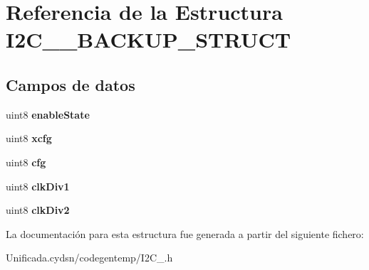 \hypertarget{struct_i2_c__1___b_a_c_k_u_p___s_t_r_u_c_t}{}\section{Referencia de la Estructura I2\+C\+\_\+\_\+\+B\+A\+C\+K\+U\+P\+\_\+\+S\+T\+R\+U\+CT}
\label{struct_i2_c__1___b_a_c_k_u_p___s_t_r_u_c_t}
\subsection*{Campos de datos}
\begin{DoxyCompactItemize}
\item 
\mbox{\label{struct_i2_c__1___b_a_c_k_u_p___s_t_r_u_c_t_a0d9eac82e0d9647810c46a0da6e36302}} 
uint8 {\bfseries enable\+State}
\item 
\mbox{\label{struct_i2_c__1___b_a_c_k_u_p___s_t_r_u_c_t_a715f36badc706ac162df2688e42d0111}} 
uint8 {\bfseries xcfg}
\item 
\mbox{\label{struct_i2_c__1___b_a_c_k_u_p___s_t_r_u_c_t_ab8eb8d5560ec63aaa6b0521bfb9c34d9}} 
uint8 {\bfseries cfg}
\item 
\mbox{\label{struct_i2_c__1___b_a_c_k_u_p___s_t_r_u_c_t_a82ea4753093a33ff6f406c8cd6a9e173}} 
uint8 {\bfseries clk\+Div1}
\item 
\mbox{\label{struct_i2_c__1___b_a_c_k_u_p___s_t_r_u_c_t_afc3c99a74dcecfae2a734bf008319b56}} 
uint8 {\bfseries clk\+Div2}
\end{DoxyCompactItemize}


La documentación para esta estructura fue generada a partir del siguiente fichero\+:\begin{DoxyCompactItemize}
\item 
Unificada.\+cydsn/codegentemp/I2\+C\+\_.\+h\end{DoxyCompactItemize}
